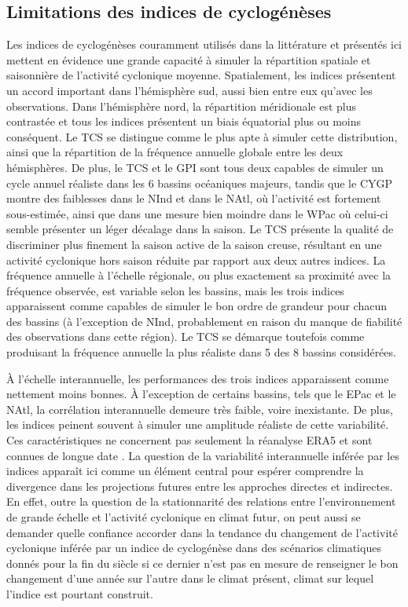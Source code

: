 \documentclass[../main.tex]{subfiles}
\begin{document}
\subsection{Limitations des indices de cyclogénèses}

Les indices de cyclogénèses couramment utilisés dans la littérature et présentés ici mettent en évidence une grande capacité à simuler la répartition spatiale et
saisonnière de l'activité cyclonique moyenne. Spatialement, les indices présentent un accord important dans l'hémisphère sud, aussi bien entre eux qu'avec les
observations. Dans l'hémisphère nord, la répartition méridionale est plus contrastée et tous les indices présentent un biais équatorial plus ou moins
conséquent. Le TCS se distingue comme le plus apte à simuler cette distribution, ainsi que la répartition de la fréquence annuelle globale entre les deux
hémisphères. De plus, le TCS et le GPI sont tous deux capables de simuler un cycle annuel réaliste dans les 6 bassins océaniques majeurs, tandis que le CYGP
montre des faiblesses dans le NInd et dans le NAtl, où l'activité est fortement sous-estimée, ainsi que dans une mesure bien moindre dans le WPac où celui-ci
semble présenter un léger décalage dans la saison. Le TCS présente la qualité de discriminer plus finement la saison active de la saison creuse, résultant en
une activité cyclonique hors saison
réduite par rapport aux deux autres indices. La fréquence annuelle à l'échelle régionale, ou plus exactement sa proximité avec la fréquence observée, est
variable selon les bassins, mais les trois indices apparaissent comme capables de simuler le bon ordre de grandeur pour chacun des bassins (à l'exception de NInd,
probablement en raison du manque de fiabilité des observations dans cette région). Le TCS se démarque toutefois comme produisant la fréquence annuelle la plus
réaliste dans 5 des 8 bassins considérées.

À l'échelle interannuelle, les performances des trois indices apparaissent comme nettement moins bonnes. À l'exception de certains bassins, tels que le EPac et
le NAtl, la corrélation interannuelle demeure très faible, voire inexistante. De plus, les indices peinent souvent à simuler une amplitude réaliste de cette
variabilité. Ces caractéristiques ne concernent pas seulement la réanalyse ERA5 et sont connues de longue date
\parencite{watterson_seasonal_1995,camargo_tropical_2007,tippett_poisson_2011,menkes_comparison_2012,wang_dynamic_2020,cavicchia_tropical_2023a}. La question de
la variabilité interannuelle inférée par les indices apparaît ici comme un élément central pour espérer comprendre la divergence dans les projections futures
entre les approches directes et indirectes. En effet, outre la question de la stationnarité des relations entre l'environnement de grande échelle et l'activité
cyclonique en climat futur, on peut aussi se demander quelle confiance accorder dans la tendance du changement de l'activité cyclonique inférée par un indice de
cyclogénèse dans des scénarios climatiques donnés pour la fin du siècle si ce dernier n'est pas en mesure de renseigner le bon changement d'une année sur
l'autre dans le climat présent, climat sur lequel l'indice est pourtant construit.
\end{document}
